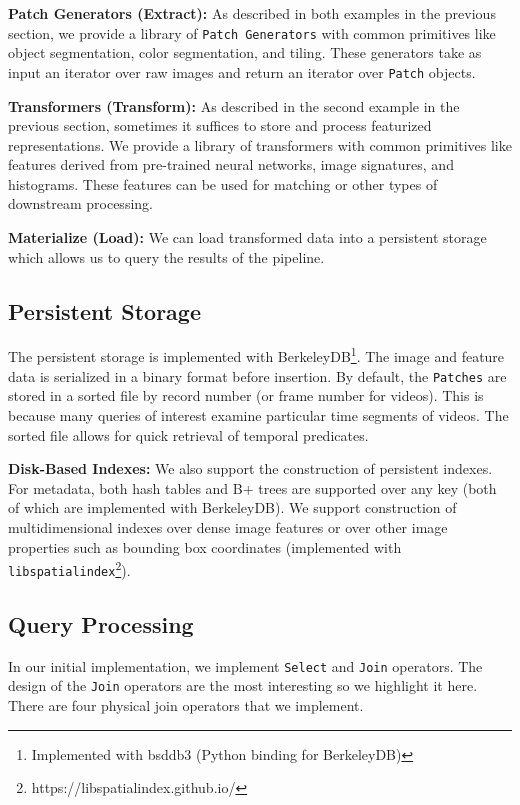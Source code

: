 \vspace{0.25em}
\noindent \textbf{Patch Generators (Extract): } As described in both examples in the previous section, we provide a library of \texttt{Patch Generators} with common primitives like object segmentation, color segmentation, and tiling. These generators take as input an iterator over raw images and return an iterator over \texttt{Patch} objects.



\vspace{0.25em}
\noindent \textbf{Transformers (Transform): } As described in the second example in the previous section, sometimes it suffices to store and process featurized representations. We provide a library of transformers with common primitives like features derived from pre-trained neural networks, image signatures, and histograms. These features can be used for matching or other types of downstream processing.

\vspace{0.25em}
\noindent \textbf{Materialize (Load): } We can load transformed data into a persistent storage which allows us to query the results of the pipeline.

\subsection{Persistent Storage}
The persistent storage is implemented with BerkeleyDB\footnote{Implemented with bsddb3 (Python binding for BerkeleyDB)}. The image and feature data is serialized in a binary format before insertion. By default, the \texttt{Patches} are stored in a sorted file by record number (or frame number for videos). This is because many queries of interest examine particular time segments of videos.
The sorted file allows for quick retrieval of temporal predicates.

\vspace{0.25em}
\noindent \textbf{Disk-Based Indexes: } We also support the construction of persistent indexes. For metadata, both hash tables and B+ trees are supported over any key (both of which are implemented with BerkeleyDB). We support construction of multidimensional indexes over dense image features or over other image properties such as bounding box coordinates (implemented with \texttt{libspatialindex}\footnote{https://libspatialindex.github.io/}).

\subsection{Query Processing}
In our initial implementation, we implement \texttt{Select} and \texttt{Join} operators. The design of the \texttt{Join} operators are the most interesting so we highlight it here. There are four physical join operators that we implement.   

